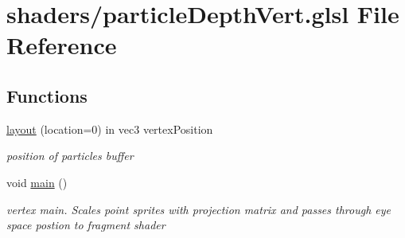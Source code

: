 \hypertarget{particle_depth_vert_8glsl}{\section{shaders/particle\-Depth\-Vert.glsl File Reference}
\label{particle_depth_vert_8glsl}
}
\subsection*{Functions}
\begin{DoxyCompactItemize}
\item 
\hypertarget{particle_depth_vert_8glsl_a3a9bed495f596aa8aed4121aacc43fdd}{\hyperlink{particle_depth_vert_8glsl_a3a9bed495f596aa8aed4121aacc43fdd}{layout} (location=0) in vec3 vertex\-Position}\label{particle_depth_vert_8glsl_a3a9bed495f596aa8aed4121aacc43fdd}

\begin{DoxyCompactList}\small\item\em position of particles buffer \end{DoxyCompactList}\item 
\hypertarget{particle_depth_vert_8glsl_acdef7a1fd863a6d3770c1268cb06add3}{void \hyperlink{particle_depth_vert_8glsl_acdef7a1fd863a6d3770c1268cb06add3}{main} ()}\label{particle_depth_vert_8glsl_acdef7a1fd863a6d3770c1268cb06add3}

\begin{DoxyCompactList}\small\item\em vertex main. Scales point sprites with projection matrix and passes through eye space postion to fragment shader \end{DoxyCompactList}\end{DoxyCompactItemize}
